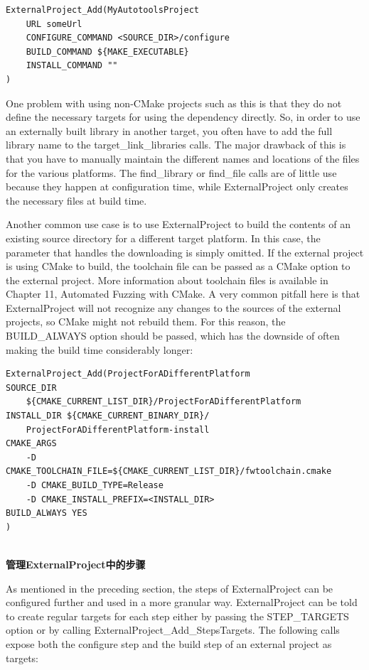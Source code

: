 \begin{lstlisting}[style=styleCMake]
ExternalProject_Add(MyAutotoolsProject
	URL someUrl
	CONFIGURE_COMMAND <SOURCE_DIR>/configure
	BUILD_COMMAND ${MAKE_EXECUTABLE}
	INSTALL_COMMAND ""
)
\end{lstlisting}

One problem with using non-CMake projects such as this is that they do not define the necessary targets for using the dependency directly. So, in order to use an externally built library in another target, you often have to add the full library name to the target\_link\_libraries calls. The major drawback of this is that you have to manually maintain the different names and locations of the files for the various platforms. The find\_library or find\_file calls are of little use because they happen at configuration time, while ExternalProject only creates the necessary files at build time.

Another common use case is to use ExternalProject to build the contents of an existing source directory for a different target platform. In this case, the parameter that handles the downloading is simply omitted. If the external project is using CMake to build, the toolchain file can be passed as a CMake option to the external project. More information about toolchain files is available in Chapter 11, Automated Fuzzing with CMake. A very common pitfall here is that ExternalProject will not recognize any changes to the sources of the external projects, so CMake might not rebuild them. For this reason, the BUILD\_ALWAYS option should be passed, which has the downside of often making the build time considerably longer:

\begin{lstlisting}[style=styleCMake]
ExternalProject_Add(ProjectForADifferentPlatform
SOURCE_DIR 
	${CMAKE_CURRENT_LIST_DIR}/ProjectForADifferentPlatform
INSTALL_DIR ${CMAKE_CURRENT_BINARY_DIR}/
	ProjectForADifferentPlatform-install
CMAKE_ARGS
	-D CMAKE_TOOLCHAIN_FILE=${CMAKE_CURRENT_LIST_DIR}/fwtoolchain.cmake
	-D CMAKE_BUILD_TYPE=Release
	-D CMAKE_INSTALL_PREFIX=<INSTALL_DIR>
BUILD_ALWAYS YES
)
\end{lstlisting}

\hspace*{\fill} \\ %
\noindent
\textbf{管理ExternalProject中的步骤}

As mentioned in the preceding section, the steps of ExternalProject can be configured further and used in a more granular way. ExternalProject can be told to create regular targets for each step either by passing the STEP\_TARGETS option or by calling ExternalProject\_Add\_StepsTargets. The following calls expose both the configure step and the build step of an external project as targets:

